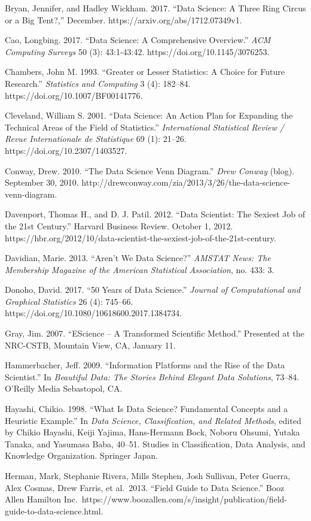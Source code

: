 \documentclass[
  letterpaper,
  DIV=11,
  numbers=noendperiod]{scrreprt}
\begin{document}
Bryan, Jennifer, and Hadley Wickham. 2017. ``Data Science: A Three Ring
Circus or a Big Tent?,'' December. https://arxiv.org/abs/1712.07349v1.

Cao, Longbing. 2017. ``Data Science: A Comprehensive Overview.''
\emph{ACM Computing Surveys} 50 (3): 43:1-43:42.
https://doi.org/10.1145/3076253.

Chambers, John M. 1993. ``Greater or Lesser Statistics: A Choice for
Future Research.'' \emph{Statistics and Computing} 3 (4): 182--84.
https://doi.org/10.1007/BF00141776.

Cleveland, William S. 2001. ``Data Science: An Action Plan for Expanding
the Technical Areas of the Field of Statistics.'' \emph{International
Statistical Review / Revue Internationale de Statistique} 69 (1):
21--26. https://doi.org/10.2307/1403527.

Conway, Drew. 2010. ``The Data Science Venn Diagram.'' \emph{Drew
Conway} (blog). September 30, 2010.
http://drewconway.com/zia/2013/3/26/the-data-science-venn-diagram.

Davenport, Thomas H., and D. J. Patil. 2012. ``Data Scientist: The
Sexiest Job of the 21st Century.'' Harvard Business Review. October 1,
2012.
https://hbr.org/2012/10/data-scientist-the-sexiest-job-of-the-21st-century.

Davidian, Marie. 2013. ``Aren't We Data Science?'' \emph{AMSTAT News:
The Membership Magazine of the American Statistical Association}, no.
433: 3.

Donoho, David. 2017. ``50 Years of Data Science.'' \emph{Journal of
Computational and Graphical Statistics} 26 (4): 745--66.
https://doi.org/10.1080/10618600.2017.1384734.

Gray, Jim. 2007. ``EScience -- A Transformed Scientific Method.''
Presented at the NRC-CSTB, Mountain View, CA, January 11.

Hammerbacher, Jeff. 2009. ``Information Platforms and the Rise of the
Data Scientist.'' In \emph{Beautiful Data: The Stories Behind Elegant
Data Solutions}, 73--84. O'Reilly Media Sebastopol, CA.

Hayashi, Chikio. 1998. ``What Is Data Science? Fundamental Concepts and
a Heuristic Example.'' In \emph{Data Science, Classification, and
Related Methods}, edited by Chikio Hayashi, Keiji Yajima, Hans-Hermann
Bock, Noboru Ohsumi, Yutaka Tanaka, and Yasumasa Baba, 40--51. Studies
in Classification, Data Analysis, and Knowledge Organization. Springer
Japan.

Herman, Mark, Stephanie Rivera, Mills Stephen, Josh Sullivan, Peter
Guerra, Alex Cosmas, Drew Farris, et al.~2013. ``Field Guide to Data
Science.'' Booz Allen Hamilton
Inc.~https://www.boozallen.com/s/insight/publication/field-guide-to-data-science.html.
\end{document}
